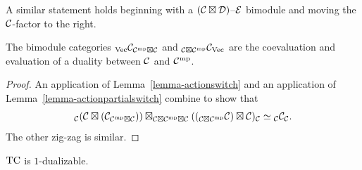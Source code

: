 \documentclass{amsart}
\begin{document}
\nid A similar statement holds beginning with a $(\mathcal C \boxtimes \mathcal D)$--$\mathcal E$ bimodule and moving the $\mathcal C$-factor to the right.

\begin{proposition} \label{thm:objduals}
The bimodule categories ${}_\mathrm{\mathrm{Vec}} \mathcal C_{\mathcal C^{\mathrm{mp}} \boxtimes \mathcal C}$ and ${}_{\mathcal C \boxtimes \mathcal C^{\mathrm{mp}}} \mathcal C_{\mathrm{Vec}}$ are the coevaluation and evaluation of a duality between $\mathcal C$ and $\mathcal C^{\mathrm{mp}}$.
\end{proposition}
\begin{proof}
An application of Lemma~\ref{lemma-actionswitch} and an application of Lemma~\ref{lemma-actionpartialswitch} combine to show that
\[
{}_\mathcal C (\mathcal C \boxtimes (\mathcal C_{\mathcal C^{\mathrm{mp}} \boxtimes \mathcal C})) \boxtimes_{\mathcal C \boxtimes \mathcal C^{\mathrm{mp}} \boxtimes \mathcal C} (({}_{\mathcal C \boxtimes \mathcal C^{\mathrm{mp}}} \mathcal C) \boxtimes \mathcal C)_\mathcal C
\simeq
{}_\mathcal C \mathcal C_\mathcal C.
\]
The other zig-zag is similar.
\end{proof}

\begin{corollary}
	$\mathrm{TC}$ is $1$-dualizable. 
\end{corollary}

\end{document}

